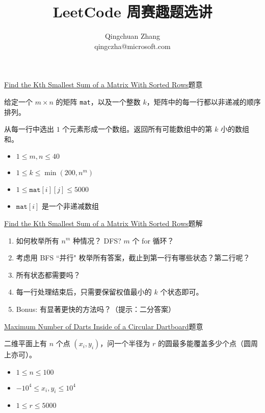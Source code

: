 \documentclass{beamer}
\title{LeetCode 周赛趣题选讲}
\author{Qingchuan Zhang\\ qingczha@microsoft.com}
\institute{Microsoft}
\begin{document}
\begin{frame}
\maketitle
\end{frame}


\begin{frame}{\href{https://leetcode.com/problems/find-the-kth-smallest-sum-of-a-matrix-with-sorted-rows/}{Find the Kth Smallest Sum of a Matrix With Sorted Rows}}{题意}

给定一个 $m \times n$ 的矩阵 \texttt{mat}，以及一个整数 $k$，矩阵中的每一行都以非递减的顺序排列。

从每一行中选出 $1$ 个元素形成一个数组。返回所有可能数组中的第 $k$ 小的数组和。
\begin{itemize}
    \item $1 \le m, n \le 40$
    \item $1 \le k \le \min(200, n^m)$
    \item $1 \le \texttt{mat}[i][j] \le 5000$
    \item $\texttt{mat}[i]$ 是一个非递减数组
\end{itemize}
\end{frame}


\begin{frame}{\href{https://leetcode.com/problems/find-the-kth-smallest-sum-of-a-matrix-with-sorted-rows/}{Find the Kth Smallest Sum of a Matrix With Sorted Rows}}{题解}

\begin{enumerate}
    \item 如何枚举所有 $n^m$ 种情况？ DFS? $m$ 个 for 循环？
    \item 考虑用 BFS ``并行" 枚举所有答案，截止到第一行有哪些状态？第二行呢？
    \item 所有状态都需要吗？
    \item 每一行处理结束后，只需要保留权值最小的 $k$ 个状态即可。
    \item Bonus: 有显著更快的方法吗？（提示：二分答案）
\end{enumerate}
\end{frame}


\begin{frame}{\href{https://leetcode.com/problems/maximum-number-of-darts-inside-of-a-circular-dartboard/}{Maximum Number of Darts Inside of a Circular Dartboard}}{题意}

二维平面上有 $n$ 个点 $(x_i,y_i)$，问一个半径为 $r$ 的圆最多能覆盖多少个点（圆周上亦可）。

\begin{itemize}
    \item $1\le n\le 100$
    \item $-10^4 \le x_i,y_i \le 10^4$
    \item $1\le r\le 5000$
\end{itemize}
\end{frame}
\end{document}

